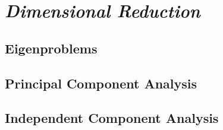 \chapter{\emph{Dimensional Reduction}} 
\label{dimensionalreduction}

\section{Eigenproblems}
\section{Principal Component Analysis}
\section{Independent Component Analysis}